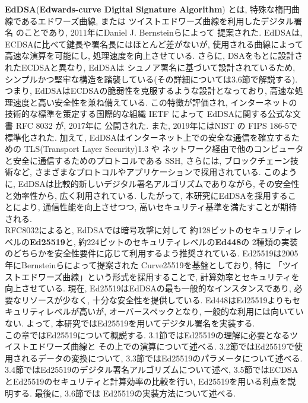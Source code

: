 \textbf{EdDSA}(\textbf{Edwards-curve Digital Signature Algorithm})
とは,  特殊な楕円曲線であるエドワーズ曲線, または
ツイストエドワーズ曲線\cite{twisted}を利用したデジタル署名
のことであり, 2011年にDaniel J. Bernsteinらによって
提案された\cite{high-speed}. 
EdDSAは, ECDSAに比べて鍵長や署名長にはほとんど差がないが, 
使用される曲線によって高速な演算を可能にし, 処理速度を向上させている. 
さらに, DSAをもとに設計されたECDSAと異なり, EdDSAは
シュノア署名\cite{schnorr}に基づいて設計されているため, 
シンプルかつ堅牢な構造を踏襲している(その詳細については3.6節で解説する). 
つまり, EdDSAはECDSAの脆弱性を克服するような設計となっており, 
高速な処理速度と高い安全性を兼ね備えている. この特徴が評価され, 
インターネットの技術的な標準を策定する国際的な組織 IETF によって
EdDSAに関する公式な文書 RFC 8032 \cite{8032}が, 2017年に
公開された. また, 2019年にはNIST の FIPS 186-5で標準化された. 
加えて, EdDSAはインターネット上での安全な通信を確立するための 
TLS(Transport Layer Security)1.3 \cite{rfc8446}や
ネットワーク経由で他のコンピュータと安全に通信するためのプロトコルである 
SSH, さらには, ブロックチェーン技術\cite{monero}など, 
さまざまなプロトコルやアプリケーションで採用されている. 
このように, EdDSAは比較的新しいデジタル署名アルゴリズムでありながら, 
その安全性と効率性から, 広く利用されている. 
したがって, 本研究にEdDSAを採用することにより, 通信性能を向上させつつ, 
高いセキュリティ基準を満たすことが期待される.\\
\indent RFC8032によると, EdDSAでは暗号攻撃に対して
約128ビットのセキュリティレベルの\textbf{Ed25519}と, 
約224ビットのセキュリティレベルの\textbf{Ed448}の
2種類の実装のどちらかを安全性要件に応じて利用するよう推奨されている. 
Ed25519は2005年にBernsteinらによって提案された
Curve25519\cite{curve25519}を基盤としており, 特に
「ツイストエドワーズ曲線」という形式を採用することで, 
計算効率とセキュリティを向上させている. 
現在, Ed25519はEdDSAの最も一般的なインスタンスであり, 
必要なリソースが少なく, 十分な安全性を提供している. 
Ed448はEd25519よりもセキュリティレベルが高いが, 
オーバースペックとなり, 一般的な利用には向いていない. 
よって, 本研究ではEd25519を用いてデジタル署名を実装する.\\
\indent この章ではEd25519について概説する. 
3.1節ではEd25519の理解に必要となるツイストエドワーズ曲線と
その上での演算について述べる. 
3.2節ではEd25519で使用されるデータの変換について, 
3.3節ではEd25519のパラメータについて述べる. 
3.4節ではEd25519のデジタル署名アルゴリズムについて述べ, 
3.5節ではECDSAとEd25519のセキュリティと計算効率の比較を行い, 
Ed25519を用いる利点を説明する. 最後に, 3.6節では
Ed25519の実装方法について述べる.\\
